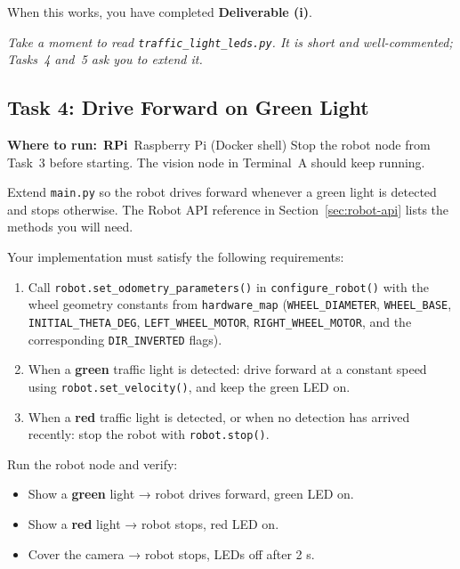 \documentclass{ol-softwaremanual}
\newcommand{\onrpi}{%
  \,\colorbox{blue!20}{\footnotesize\sffamily\bfseries RPi}}
\newcommand{\machinebox}[2]{%
  \par\noindent
  \colorbox{gray!12}{\parbox{\dimexpr\linewidth-2\fboxsep}{%
    \small\sffamily\textbf{Where to run:} #1 \quad\textbar\quad #2}}%
  \par\smallskip}
\begin{document}
\noindent When this works, you have completed \textbf{Deliverable (i)}.

\medskip\noindent\textit{Take a moment to read \texttt{traffic\_light\_leds.py}.
It is short and well-commented; Tasks~4 and~5 ask you to extend it.}


\subsection{Task 4: Drive Forward on Green Light}

\machinebox{\onrpi\ Raspberry Pi (Docker shell)}{Stop the robot node from Task~3 before starting. The vision node in Terminal~A should keep running.}

Extend \texttt{main.py} so the robot drives forward whenever a green light is
detected and stops otherwise.
The Robot API reference in Section~\ref{sec:robot-api} lists the methods you
will need.

Your implementation must satisfy the following requirements:

\begin{enumerate}
  \item Call \texttt{robot.set\_odometry\_parameters()} in \texttt{configure\_robot()}
        with the wheel geometry constants from \texttt{hardware\_map}
        (\texttt{WHEEL\_DIAMETER}, \texttt{WHEEL\_BASE}, \texttt{INITIAL\_THETA\_DEG},
        \texttt{LEFT\_WHEEL\_MOTOR}, \texttt{RIGHT\_WHEEL\_MOTOR}, and the
        corresponding \texttt{DIR\_INVERTED} flags).
  \item When a \textbf{green} traffic light is detected: drive forward at a
        constant speed using \texttt{robot.set\_velocity()}, and keep the green
        LED on.
  \item When a \textbf{red} traffic light is detected, or when no detection has
        arrived recently: stop the robot with \texttt{robot.stop()}.
\end{enumerate}

Run the robot node and verify:

\begin{itemize}
  \item Show a \textbf{green} light → robot drives forward, green LED on.
  \item Show a \textbf{red} light → robot stops, red LED on.
  \item Cover the camera → robot stops, LEDs off after 2 s.
\end{itemize}
\end{document}
